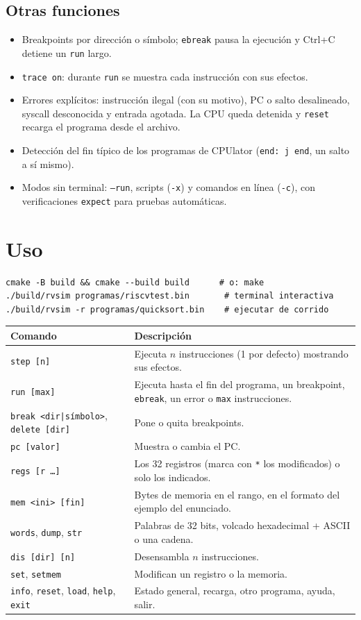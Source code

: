 \documentclass[11pt,a4paper]{article}
\newcommand{\cmd}[1]{\texttt{#1}}
\begin{document}
\subsection*{Otras funciones}
\begin{itemize}
  \item Breakpoints por dirección o símbolo; \cmd{ebreak} pausa la ejecución y Ctrl+C detiene un \cmd{run} largo.
  \item \cmd{trace on}: durante \cmd{run} se muestra cada instrucción con sus efectos.
  \item Errores explícitos: instrucción ilegal (con su motivo), PC o salto desalineado, syscall desconocida y
        entrada agotada. La CPU queda detenida y \cmd{reset} recarga el programa desde el archivo.
  \item Detección del fin típico de los programas de CPUlator (\cmd{end: j end}, un salto a sí mismo).
  \item Modos sin terminal: \cmd{--run}, scripts (\cmd{-x}) y comandos en línea (\cmd{-c}), con verificaciones
        \cmd{expect} para pruebas automáticas.
\end{itemize}

\section{Uso}
\begin{lstlisting}
cmake -B build && cmake --build build      # o: make
./build/rvsim programas/riscvtest.bin       # terminal interactiva
./build/rvsim -r programas/quicksort.bin    # ejecutar de corrido
\end{lstlisting}

\begin{center}
\begin{tabularx}{\textwidth}{@{}l X@{}}
\toprule
Comando & Descripción \\
\midrule
\cmd{step [n]} & Ejecuta $n$ instrucciones (1 por defecto) mostrando sus efectos. \\
\cmd{run [max]} & Ejecuta hasta el fin del programa, un breakpoint, \cmd{ebreak}, un error o \cmd{max} instrucciones. \\
\cmd{break <dir|símbolo>}, \cmd{delete [dir]} & Pone o quita breakpoints. \\
\cmd{pc [valor]} & Muestra o cambia el PC. \\
\cmd{regs [r \ldots]} & Los 32 registros (marca con \cmd{*} los modificados) o solo los indicados. \\
\cmd{mem <ini> [fin]} & Bytes de memoria en el rango, en el formato del ejemplo del enunciado. \\
\cmd{words}, \cmd{dump}, \cmd{str} & Palabras de 32 bits, volcado hexadecimal + ASCII o una cadena. \\
\cmd{dis [dir] [n]} & Desensambla $n$ instrucciones. \\
\cmd{set}, \cmd{setmem} & Modifican un registro o la memoria. \\
\cmd{info}, \cmd{reset}, \cmd{load}, \cmd{help}, \cmd{exit} & Estado general, recarga, otro programa, ayuda, salir. \\
\bottomrule
\end{tabularx}
\end{center}
\end{document}
